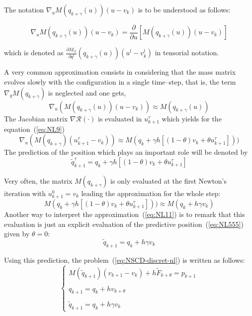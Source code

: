 \begin{remark}
The notation $\nabla_{u}M(q_{k+\gamma}(u))(u-v_{k})$ is to be understood as follows: 

$$\nabla_{u}M(q_{k+\gamma}(u))(u-v_{k})=\frac{\partial}{\partial u}[M(q_{k+\gamma}(u))(u-v_{k})]$$

which is denoted as $\frac{\partial M_{ij}}{\partial q^{l}}(q_{k+\gamma}(u))(u^{l}-v_{k}^{l})$ in tensorial notation.
\label{remarkBABAS}
\end{remark}



A very common approximation consists in considering that the mass matrix evolves slowly with the configuration in a single time--step, that is, the term $\nabla_{q} M(q_{k+\gamma})$ is neglected and one gets,
\begin{equation}
  \label{eq:NL9}
    \nabla_u  (M(q_{k+\gamma}(u) ) (u-v_{k})) \approx  M(q_{k+\gamma}(u) )
\end{equation}
The Jacobian matrix $\nabla \mathcal R (\cdot)$ is evaluated in $u^{\tau}_{k+1}$ which yields for the  equation~(\ref{eq:NL9})
\begin{equation}
  \label{eq:NL10}
    \nabla_u  (M(q_{k+\gamma} ) (u^{\tau}_{k+1}-v_{k})) \approx  M(q_k + \gamma h [(1-\theta)v_k+\theta u^{\tau}_{k+1}] ) )
\end{equation}
The prediction of the position which plays an important role will be denoted by
\begin{equation}
  \label{eq:NL555}
  \tilde q^{\tau}_{k+1}= q_k + \gamma h [(1-\theta)v_k+\theta u^{\tau}_{k+1}] 
\end{equation}


Very often, the  matrix $M(q_{k+\gamma})$ is only  evaluated at the first Newton's iteration with $u^{0}_{k+1}= v_k$ leading the approximation for the whole step:
\begin{equation}
M(q_k + \gamma h [(1-\theta)v_k+\theta u^{\tau}_{k+1}] ) )\approx M(q_k + h \gamma v_k)
\label{eq:NL11}
\end{equation}
Another way to interpret the approximation~(\ref{eq:NL11}) is to remark that this evaluation is just an explicit evaluation of the predictive position~(\ref{eq:NL555}) given by $\theta=0$:
\begin{equation}
  \label{eq:NL5}
  \tilde q_{k+1}= q_k + h \gamma v_k
\end{equation}

Using this prediction, the problem~(\ref{eq:NSCD-discret-nl}) is written as follows:
\begin{equation}
\label{eq:NSCD-discret2}
\begin{cases}
    M(\tilde q_{k+1}) (v_{k+1}-v_{k}) + h \tilde F_{k+\theta} = p_{k+1} \\  \\
    q_{k+1} = q_{k} +  h v_{k+\theta} \\ \\
    \tilde q_{k+1}= q_k + h \gamma v_k
\end{cases}
\end{equation}


